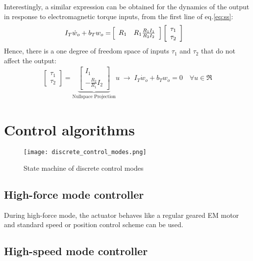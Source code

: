 Interestingly, a similar expression can be obtained for the dynamics of the output in response to electromagnetic torque inputs, from the first line of eq.\eqref{eq:ss}:
%
\begin{align}
I_T \dot{w}_o +
b_T  w_o
=&
\left[ \begin{array}{c c}
R_1 & R_1 \frac{R_1 I_1}{R_2 I_2}
\end{array} \right]
\left[ \begin{array}{c}
\tau_1 \\
\tau_2
\end{array} \right]
\label{eq:output}
\end{align}
% 
Hence, there is a one degree of freedom space of inputs $\tau_1$ and $\tau_2$ that do not affect the output:
\begin{align}
\left[ \begin{array}{c}
\tau_1 \\
\tau_2
\end{array} \right]
 = 
\underbrace{\left[ \begin{array}{c}
I_1 \\
-\frac{R_2 }{R_1 }  I_2
\end{array} \right]}_{\text{Nullspace Projection}} u
\; \rightarrow \;
I_T \dot{w}_o +
b_T  w_o = 0 \quad \forall u \in \Re
\label{eq:dyn_null_proj}
\end{align}


\section{Control algorithms}

\begin{figure}[H]
	\centering
		\texttt{[image: discrete\_control\_modes.png]}
	\caption{State machine of discrete control modes}
	\label{fig:automaticflow}
\end{figure}

\subsection{High-force mode controller}

During high-force mode, the actuator behaves like a regular geared EM motor and standard speed or position control scheme can be used. 


\subsection{High-speed mode controller}

